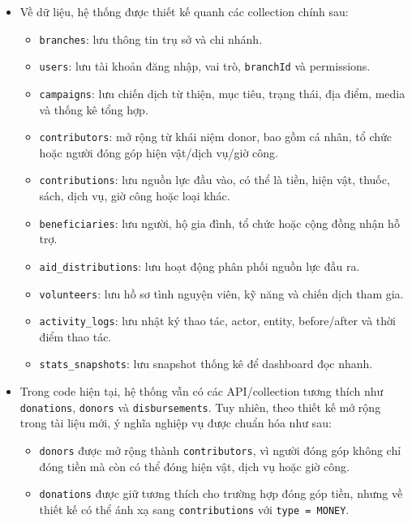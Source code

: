 \documentclass[12pt,a4paper]{article}
\begin{document}
\begin{itemize}
\begin{itemize}
\item Ghi nhật ký thao tác quan trọng để phục vụ audit.
\item Tổng hợp dashboard theo toàn hệ thống, theo chi nhánh và theo chiến dịch.
\item Kiểm tra health, replication, sharding, failover và backup/restore.
\end{itemize}
\item Về dữ liệu, hệ thống được thiết kế quanh các collection chính sau:
\begin{itemize}
\item \texttt{branches}: lưu thông tin trụ sở và chi nhánh.
\item \texttt{users}: lưu tài khoản đăng nhập, vai trò, \texttt{branchId} và permissions.
\item \texttt{campaigns}: lưu chiến dịch từ thiện, mục tiêu, trạng thái, địa điểm, media và thống kê tổng hợp.
\item \texttt{contributors}: mở rộng từ khái niệm donor, bao gồm cá nhân, tổ chức hoặc người đóng góp hiện vật/dịch vụ/giờ công.
\item \texttt{contributions}: lưu nguồn lực đầu vào, có thể là tiền, hiện vật, thuốc, sách, dịch vụ, giờ công hoặc loại khác.
\item \texttt{beneficiaries}: lưu người, hộ gia đình, tổ chức hoặc cộng đồng nhận hỗ trợ.
\item \texttt{aid\_distributions}: lưu hoạt động phân phối nguồn lực đầu ra.
\item \texttt{volunteers}: lưu hồ sơ tình nguyện viên, kỹ năng và chiến dịch tham gia.
\item \texttt{activity\_logs}: lưu nhật ký thao tác, actor, entity, before/after và thời điểm thao tác.
\item \texttt{stats\_snapshots}: lưu snapshot thống kê để dashboard đọc nhanh.
\end{itemize}
\item Trong code hiện tại, hệ thống vẫn có các API/collection tương thích như \texttt{donations}, \texttt{donors} và \texttt{disbursements}. Tuy nhiên, theo thiết kế mở rộng trong tài liệu mới, ý nghĩa nghiệp vụ được chuẩn hóa như sau:
\begin{itemize}
\item \texttt{donors} được mở rộng thành \texttt{contributors}, vì người đóng góp không chỉ đóng tiền mà còn có thể đóng hiện vật, dịch vụ hoặc giờ công.
\item \texttt{donations} được giữ tương thích cho trường hợp đóng góp tiền, nhưng về thiết kế có thể ánh xạ sang \texttt{contributions} với \texttt{type = MONEY}.

\end{itemize}
\end{itemize}
\end{document}
